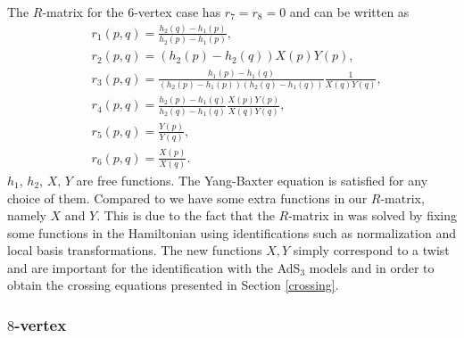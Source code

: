 \documentclass[12pt,a4paper]{article}
\numberwithin{equation}{section}
\begin{document}
The $R$-matrix for the 6-vertex case has $r_7=r_8=0$ and can be written as
%
\begin{align}
& r_1(p,q)=\frac{h_2(q)-h_1(p)}{h_2(p)-h_1(p)},\nonumber\\
& r_2(p,q) =(h_2(p)-h_2(q))X(p)Y(p),\nonumber\\
& r_3(p,q) =\frac{h_1(p)-h_1(q)}{(h_2(p)-h_1(p))(h_2(q)-h_1(q))}\frac{1}{X(q)Y(q)},\nonumber\\
& r_4(p,q) =\frac{h_2(p)-h_1(q)}{h_2(q)-h_1(q)}\frac{X(p)Y(p)}{X(q)Y(q)},\nonumber\\
& r_5(p,q) =\frac{Y(p)}{Y(q)},\nonumber\\
& r_6(p,q) =\frac{X(p)}{X(q)}.
\label{6vertex}
\end{align}
$h_1,\, h_2,\, X,\, Y$ are free functions. The Yang-Baxter equation is satisfied for any choice of them. 
Compared to \cite{deLeeuw:2020ahe} we have some extra functions in our $R$-matrix, namely $ X $ and $ Y $. This is due to the fact that the $R$-matrix in \cite{deLeeuw:2020ahe}  was solved by fixing some functions in the Hamiltonian using identifications such as normalization and local basis transformations. The new functions $X,Y$ simply correspond to a twist and are important for the identification with the AdS$_3$ models and in order to obtain the crossing equations presented in Section \ref{crossing}.

\subsubsection*{$8$-vertex}
\end{document}
